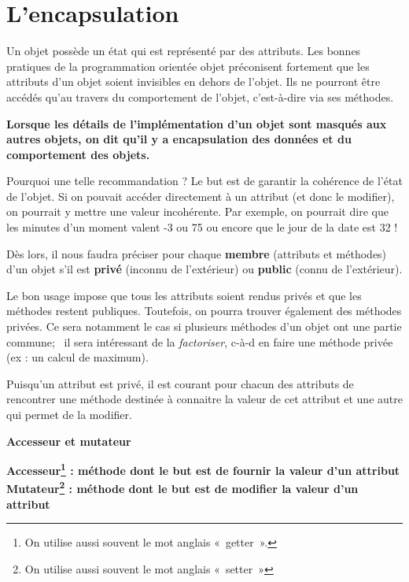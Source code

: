 \section{L'encapsulation}

Un objet possède un état qui est représenté par des attributs. Les
bonnes pratiques de la programmation orientée objet préconisent
fortement que les attributs d'un objet soient
invisibles en dehors de l'objet. Ils ne pourront être
accédés qu'au travers du comportement de
l'objet, c'est-à-dire via ses
méthodes.

{\sffamily\bfseries\upshape
{
Lorsque les détails de l'implémentation
d'un objet sont masqués aux autres objets, on dit
qu'il y a \textbf{encapsulation} des données et du
comportement des objets.}}


Pourquoi une telle recommandation ? Le but est de garantir la cohérence
de l'état de l'objet. Si on pouvait
accéder directement à un attribut (et donc le modifier), on pourrait y
mettre une valeur incohérente. Par exemple, on pourrait dire que les
minutes d'un moment valent -3 ou 75 ou encore que le
jour de la date est 32 !

Dès lors, il nous faudra préciser pour chaque \textbf{membre} (attributs
et méthodes) d'un objet s'il est
\textbf{privé} (inconnu de l'extérieur) ou
\textbf{public} (connu de l'extérieur). 

Le bon usage impose que tous les attributs soient rendus privés et que
les méthodes restent publiques. Toutefois, on pourra trouver également
des méthodes privées. Ce sera notamment le cas si plusieurs méthodes
d'un objet ont une partie commune; \ il sera
intéressant de la \textit{factoriser}, c-à-d en faire une méthode
privée (ex : un calcul de maximum).

Puisqu'un attribut est privé, il est courant pour
chacun des attributs de rencontrer une méthode destinée à connaitre la
valeur de cet attribut et une autre qui permet de la modifier.

\clearpage
{\sffamily\bfseries\upshape
Accesseur et mutateur}

{\sffamily\bfseries\upshape
{
\textbf{Accesseur}\footnote{{On utilise aussi
souvent le mot anglais «~getter~». }} : méthode dont le but est de
fournir la valeur d'un attribut
\textbf{Mutateur}\footnote{{On utilise aussi
souvent le mot anglais «~setter~»}} : méthode dont le but est de
modifier la valeur d'un attribut}}


